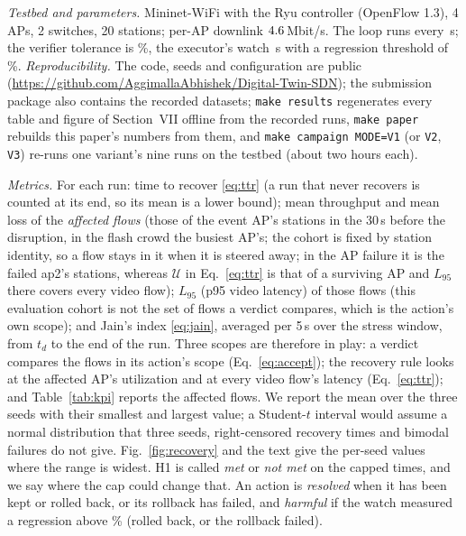 \documentclass[conference]{IEEEtran}
\begin{document}
\emph{Testbed and parameters.} Mininet-WiFi with the Ryu controller (OpenFlow 1.3), 4 APs, 2 switches, 20 stations; per-AP downlink $4.6$\,Mbit/s. The loop runs every \CfgPeriod\,s; the verifier tolerance is \CfgChangePct\%, the executor's watch \CfgWatch\,s with a regression threshold of \CfgRegressPct\%. \emph{Reproducibility.} The code, seeds and configuration are public (\url{https://github.com/AggimallaAbhishek/Digital-Twin-SDN}); the submission package also contains the recorded datasets; \texttt{make results} regenerates every table and figure of Section~VII offline from the recorded runs, \texttt{make paper} rebuilds this paper's numbers from them, and \texttt{make campaign MODE=V1} (or \texttt{V2}, \texttt{V3}) re-runs one variant's nine runs on the testbed (about two hours each).

\emph{Metrics.} For each run: time to recover \eqref{eq:ttr} (a run that never recovers is counted at its end, so its mean is a lower bound); mean throughput and mean loss of the \emph{affected flows} (those of the event AP's stations in the 30\,s before the disruption, in the flash crowd the busiest AP's; the cohort is fixed by station identity, so a flow stays in it when it is steered away; in the AP failure it is the failed ap2's stations, whereas $\mathcal U$ in Eq.~\eqref{eq:ttr} is that of a surviving AP and $L_{95}$ there covers every video flow); $L_{95}$ (p95 video latency) of those flows (this evaluation cohort is not the set of flows a verdict compares, which is the action's own scope); and Jain's index \eqref{eq:jain}, averaged per 5\,s over the stress window, from $t_d$ to the end of the run. Three scopes are therefore in play: a verdict compares the flows in its action's scope (Eq.~\eqref{eq:accept}); the recovery rule looks at the affected AP's utilization and at every video flow's latency (Eq.~\eqref{eq:ttr}); and Table~\ref{tab:kpi} reports the affected flows. We report the mean over the three seeds with their smallest and largest value; a Student-$t$ interval would assume a normal distribution that three seeds, right-censored recovery times and bimodal failures do not give. Fig.~\ref{fig:recovery} and the text give the per-seed values where the range is widest. H1 is called \emph{met} or \emph{not met} on the capped times, and we say where the cap could change that. An action is \emph{resolved} when it has been kept or rolled back, or its rollback has failed, and \emph{harmful} if the watch measured a regression above \CfgRegressPct\% (rolled back, or the rollback failed).
\end{document}
